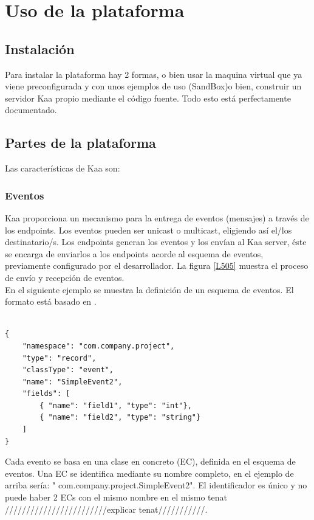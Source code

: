 \documentclass[12pt, twoside]{book}
\newcommand{\MYhref}[3][blue]{\href{#2}{\color{#1}{#3}}}
\begin{document}
\section{Uso de la plataforma}
\subsection{Instalación}
Para instalar la plataforma hay 2 formas, o bien usar la maquina virtual que ya viene preconfigurada y con unos ejemplos de uso (SandBox)o bien, construir un servidor Kaa propio mediante el código fuente. Todo esto está perfectamente documentado.
\subsection{Partes de la plataforma}
Las características de Kaa son:
\subsubsection*{Eventos}
Kaa proporciona un mecanismo para la entrega de eventos (mensajes) a través de los endpoints. Los eventos pueden ser unicast o multicast, eligiendo así el/los destinatario/s. Los endpoints generan los eventos y los envían al Kaa server, éste se encarga de enviarlos a los endpoints acorde al esquema de eventos, previamente configurado por el desarrollador. La figura \ref{L505} muestra el proceso de envío y recepción de eventos.\\
En el siguiente ejemplo se muestra la definición de un esquema de eventos. El formato está basado en \MYhref{http://avro.apache.org/docs/current/spec.html}{Avro Schema}.
\begin{lstlisting}

{
    "namespace": "com.company.project",
    "type": "record",
    "classType": "event",
    "name": "SimpleEvent2",
    "fields": [
        { "name": "field1", "type": "int"},
        { "name": "field2", "type": "string"}
    ]
}

\end{lstlisting}
Cada evento se basa en una clase en concreto (EC), definida en el esquema de eventos. Una EC se identifica mediante su nombre completo, en el ejemplo de arriba sería: " com.company.project.SimpleEvent2". El identificador es único y no puede haber 2 ECs con el mismo nombre en el mismo tenat ////////////////////////explicar tenat///////////.\\
\end{document}
